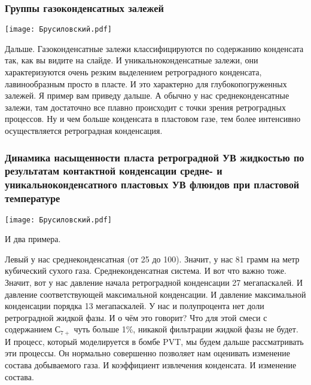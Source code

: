 \documentclass[main.tex]{subfiles}
\begin{document}
\subsubsection{Группы газоконденсатных залежей}

\begin{center}
\texttt{[image: Брусиловский.pdf]}
\end{center}

Дальше.
Газоконденсатные залежи классифицируются по содержанию конденсата так, как вы видите на слайде.
И уникальноконденсатные залежи, они характеризуются очень резким выделением ретроградного конденсата, лавинообразным просто в пласте.
И это характерно для глубокопогруженных залежей.
Я пример вам приведу дальше.
А обычно у нас среднеконденсатные залежи, там достаточно все плавно происходит с точки зрения ретроградных процессов.
Ну и чем больше конденсата в пластовом газе, тем более интенсивно осуществляется ретроградная конденсация.

\subsubsection{Динамика насыщенности пласта ретроградной УВ жидкостью по результатам контактной конденсации средне- и уникальноконденсатного пластовых УВ флюидов при пластовой температуре}

\begin{center}
\texttt{[image: Брусиловский.pdf]}
\end{center}

И два примера.

Левый у нас среднеконденсатная (от 25 до 100).
Значит, у нас 81 грамм на метр кубический сухого газа.
Среднеконденсатная система.
И вот что важно тоже.
Значит, вот у нас давление начала ретроградной конденсации 27 мегапаскалей.
И давление соответствующей максимальной конденсации.
И давление максимальной конденсации порядка 13 мегапаскалей.
У нас и полупроцента нет доли ретроградной жидкой фазы.
И о чём это говорит?
Что для этой смеси с содержанием $С_{7+}$ чуть больше 1\%, никакой фильтрации жидкой фазы не будет.
И процесс, который моделируется в бомбе PVT, мы будем дальше рассматривать эти процессы.
Он нормально совершенно позволяет нам оценивать изменение состава добываемого газа.
И коэффициент извлечения конденсата.
И изменение состава.
\end{document}

